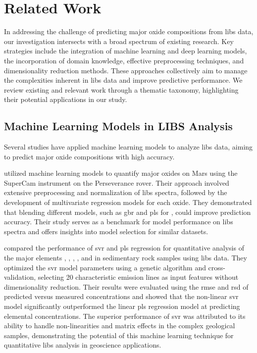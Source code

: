 \section{Related Work}\label{sec:related-work}
In addressing the challenge of predicting major oxide compositions from \gls{libs} data, our investigation intersects with a broad spectrum of existing research.
Key strategies include the integration of machine learning and deep learning models, the incorporation of domain knowledge, effective preprocessing techniques, and dimensionality reduction methods.
These approaches collectively aim to manage the complexities inherent in \gls{libs} data and improve predictive performance.
We review existing and relevant work through a thematic taxonomy, highlighting their potential applications in our study.

\subsection{Machine Learning Models in LIBS Analysis}
Several studies have applied machine learning models to analyze \gls{libs} data, aiming to predict major oxide compositions with high accuracy.

\citet{andersonPostlandingMajorElement2022} utilized machine learning models to quantify major oxides on Mars using the SuperCam instrument on the Perseverance rover.
Their approach involved extensive preprocessing and normalization of \gls{libs} spectra, followed by the development of multivariate regression models for each oxide.
They demonstrated that blending different models, such as \gls{gbr} and \gls{pls} for , could improve prediction accuracy.
Their study serves as a benchmark for model performance on \gls{libs} spectra and offers insights into model selection for similar datasets.

\citet{shi_svr_libs_2015} compared the performance of \gls{svr} and \gls{pls} regression for quantitative analysis of the major elements , , , , and  in sedimentary rock samples using \gls{libs} data.
They optimized the \gls{svr} model parameters using a genetic algorithm and cross-validation, selecting 20 characteristic emission lines as input features without dimensionality reduction.
Their results were evaluated using the \gls{rmse} and \gls{rsd} of predicted versus measured concentrations and showed that the non-linear \gls{svr} model significantly outperformed the linear \gls{pls} regression model at predicting elemental concentrations.
The superior performance of \gls{svr} was attributed to its ability to handle non-linearities and matrix effects in the complex geological samples, demonstrating the potential of this machine learning technique for quantitative \gls{libs} analysis in geoscience applications.

